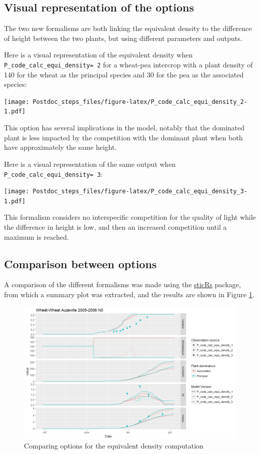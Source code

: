 \documentclass[]{book}
\begin{document}
\hypertarget{visual-representation-of-the-options}{%
\subsection{Visual representation of the options}\label{visual-representation-of-the-options}}

The two new formalisms are both linking the equivalent density to the difference of height between the two plants, but using different parameters and outputs.

Here is a visual representation of the equivalent density when \texttt{P\_code\_calc\_equi\_density=\ 2} for a wheat-pea intercrop with a plant density of 140 for the wheat as the principal species and 30 for the pea as the associated species:

\texttt{[image: Postdoc\_steps\_files/figure-latex/P\_code\_calc\_equi\_density\_2-1.pdf]}

This option has several implications in the model, notably that the dominated plant is less impacted by the competition with the dominant plant when both have approximately the same height.

Here is a visual representation of the same output when \texttt{P\_code\_calc\_equi\_density=\ 3}:

\texttt{[image: Postdoc\_steps\_files/figure-latex/P\_code\_calc\_equi\_density\_3-1.pdf]}

This formalism considers no interspecific competition for the quality of light while the difference in height is low, and then an increased competition until a maximum is reached.

\hypertarget{comparison-between-options}{%
\subsection{Comparison between options}\label{comparison-between-options}}

A comparison of the different formalisms was made using the \href{https://github.com/VEZY/sticRs}{sticRs} package, from which a summary plot was extracted, and the results are shown in Figure \ref{fig:trgcomparison2}.

\begin{figure}
\centering
\includegraphics{img/Equi_dens_3.png}
\caption{\label{fig:trgcomparison2}Comparing options for the equivalent density computation}
\end{figure}
\end{document}
